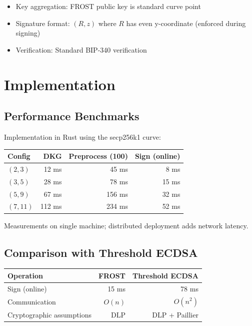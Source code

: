 \documentclass[11pt,a4paper]{article}
\begin{document}
\begin{itemize}
    \item Key aggregation: FROST public key is standard curve point
    \item Signature format: $(R, z)$ where $R$ has even y-coordinate (enforced during signing)
    \item Verification: Standard BIP-340 verification
\end{itemize}

\section{Implementation}

\subsection{Performance Benchmarks}

Implementation in Rust using the secp256k1 curve:

\begin{center}
\begin{tabular}{|l|r|r|r|}
\hline
\textbf{Config} & \textbf{DKG} & \textbf{Preprocess (100)} & \textbf{Sign (online)} \\
\hline
$(2,3)$ & 12 ms & 45 ms & 8 ms \\
$(3,5)$ & 28 ms & 78 ms & 15 ms \\
$(5,9)$ & 67 ms & 156 ms & 32 ms \\
$(7,11)$ & 112 ms & 234 ms & 52 ms \\
\hline
\end{tabular}
\end{center}

Measurements on single machine; distributed deployment adds network latency.

\subsection{Comparison with Threshold ECDSA}

\begin{center}
\begin{tabular}{|l|r|r|}
\hline
\textbf{Operation} & \textbf{FROST} & \textbf{Threshold ECDSA} \\
\hline
Sign (online) & 15 ms & 78 ms \\
Communication & $O(n)$ & $O(n^2)$ \\
Cryptographic assumptions & DLP & DLP + Paillier \\
\hline
\end{tabular}
\end{center}
\end{document}
